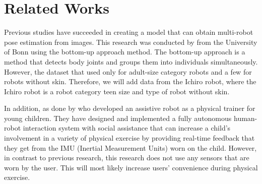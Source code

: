 \section{Related Works}
\label{sec:relatedworks}


Previous studies have succeeded in creating a model that can obtain multi-robot pose estimation from images.
This research was conducted by \citet{amini2021} from the University of Bonn using the bottom-up approach method.
The bottom-up approach is a method that detects body joints and groups them into individuals simultaneously.
However, the dataset that used only for adult-size category robots and a few for robots without skin. Therefore,
we will add data from the Ichiro robot, where the Ichiro robot is a robot category teen size and type of robot without skin.

In addition, as done by \citet{güneysu2017} who developed an assistive robot as a physical trainer for young children.
They have designed and implemented a fully autonomous human-robot interaction system with social assistance that can increase a
child's involvement in a variety of physical exercise by providing real-time feedback that they get from the IMU (Inertial Measurement Units) worn on the child.
However, in contrast to previous research, this research does not use any sensors that are worn by the user. This will most likely increase users' convenience during physical exercise.